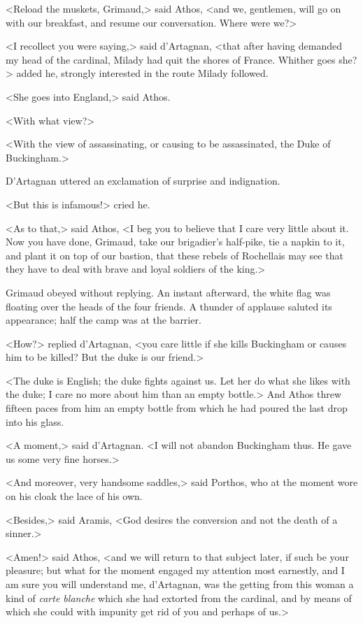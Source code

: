 <Reload the muskets, Grimaud,> said Athos, <and we, gentlemen, will go on with our breakfast, and resume our conversation. Where were we?> 

<I recollect you were saying,> said d'Artagnan, <that after having demanded my head of the cardinal, Milady had quit the shores of France. Whither goes she?> added he, strongly interested in the route Milady followed. 

<She goes into England,> said Athos. 

<With what view?> 

<With the view of assassinating, or causing to be assassinated, the Duke of Buckingham.> 

D'Artagnan uttered an exclamation of surprise and indignation. 

<But this is infamous!> cried he. 

<As to that,> said Athos, <I beg you to believe that I care very little about it. Now you have done, Grimaud, take our brigadier's half-pike, tie a napkin to it, and plant it on top of our bastion, that these rebels of Rochellais may see that they have to deal with brave and loyal soldiers of the king.> 

Grimaud obeyed without replying. An instant afterward, the white flag was floating over the heads of the four friends. A thunder of applause saluted its appearance; half the camp was at the barrier. 

<How?> replied d'Artagnan, <you care little if she kills Buckingham or causes him to be killed? But the duke is our friend.> 

<The duke is English; the duke fights against us. Let her do what she likes with the duke; I care no more about him than an empty bottle.> And Athos threw fifteen paces from him an empty bottle from which he had poured the last drop into his glass. 

<A moment,> said d'Artagnan. <I will not abandon Buckingham thus. He gave us some very fine horses.> 

<And moreover, very handsome saddles,> said Porthos, who at the moment wore on his cloak the lace of his own. 

<Besides,> said Aramis, <God desires the conversion and not the death of a sinner.> 

<Amen!> said Athos, <and we will return to that subject later, if such be your pleasure; but what for the moment engaged my attention most earnestly, and I am sure you will understand me, d'Artagnan, was the getting from this woman a kind of \textit{carte blanche} which she had extorted from the cardinal, and by means of which she could with impunity get rid of you and perhaps of us.> 


